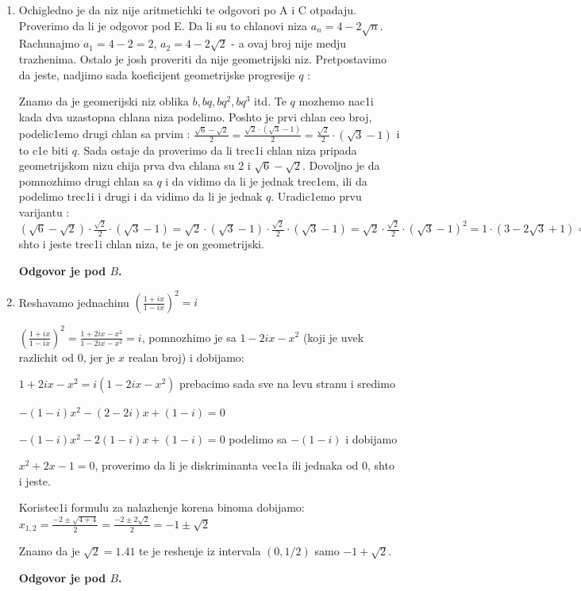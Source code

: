 \documentclass[a4paper,12pt]{article}
\begin{document}
\begin{enumerate}[1.]
\item Ochigledno je da niz nije aritmetichki te odgovori po A i C otpadaju. Proverimo da li je odgovor pod E. Da li su to chlanovi niza $a_n = 4 - 2\sqrt{n} $. Rachunajmo $a_1 = 4-2 = 2$, $a_2 = 4 - 2\sqrt{2}$ - a ovaj broj nije medju trazhenima. Ostalo je josh proveriti da nije geometrijski niz. Pretpostavimo da jeste, nadjimo sada koeficijent geometrijske progresije $q$ :
\par Znamo da je geomerijski niz oblika $b, bq, bq^2, bq^3$ itd. Te $q$ mozhemo nac1i kada dva uzastopna chlana niza podelimo. Poshto je prvi chlan ceo broj, podelic1emo drugi chlan sa prvim : $ \frac{\sqrt{6} - \sqrt{2}}{2} = \frac{\sqrt{2} \cdot (\sqrt{3} - 1)}{2} =\frac{\sqrt{2}}{2} \cdot (\sqrt{3} - 1) $ i to c1e biti $q$. Sada ostaje da proverimo da li trec1i chlan niza pripada geometrijskom nizu chija prva dva chlana su 2 i $\sqrt{6} - \sqrt{2}$. Dovoljno je da pomnozhimo drugi chlan sa $q$ i da vidimo da li je jednak trec1em, ili da podelimo trec1i i drugi i da vidimo da li je jednak $q$. Uradic1emo prvu varijantu : $(\sqrt{6} - \sqrt{2}) \cdot \frac{\sqrt{2}}{2} \cdot (\sqrt{3} - 1) = \sqrt{2} \cdot (\sqrt{3} - 1) \cdot \frac{\sqrt{2}}{2} \cdot (\sqrt{3} - 1) = \sqrt{2} \cdot \frac{\sqrt{2}}{2} \cdot (\sqrt{3} - 1)^2 = 1 \cdot (3 - 2\sqrt{3} + 1) = 4 - 2\sqrt{2}$ shto i jeste trec1i chlan niza, te je on geometrijski. \par \textbf{Odgovor je pod $B$.}

\item Reshavamo jednachinu $\left(\frac{1 + ix}{1 - ix}\right)^2 = i $
\par $\left(\frac{1 + ix}{1 - ix}\right)^2 =\frac{1 +2ix -x^2}{1 -2ix - x^2} = i $, pomnozhimo je sa $1 - 2ix -x^2$ (koji je uvek razlichit od 0, jer je $x$ realan broj) i dobijamo:
\par $1 +2ix -x^2 = i(1 - 2ix -x^2)$ prebacimo sada sve na levu stranu i sredimo
\par $-(1-i)x^2 -(2-2i)x + (1-i) = 0$
\par $-(1-i)x^2 -2(1-i)x + (1-i) = 0$ podelimo sa $-(1-i)$ i dobijamo
\par $x^2 +2x -1 = 0$, proverimo da li je diskriminanta vec1a ili jednaka od 0, shto i jeste.
\par Koristec1i formulu za nalazhenje korena binoma dobijamo: $x_{1,2} = \frac{-2 \pm \sqrt{4 + 4}}{2} = \frac{-2 \pm 2\sqrt{2}}{2} = -1 \pm \sqrt{2}$
\par Znamo da je $\sqrt{2} = 1.41$ te je reshenje iz intervala $(0,1/2)$ samo $-1 + \sqrt{2}$.
\par \textbf{Odgovor je pod $B$.}


\end{enumerate}
\end{document}

